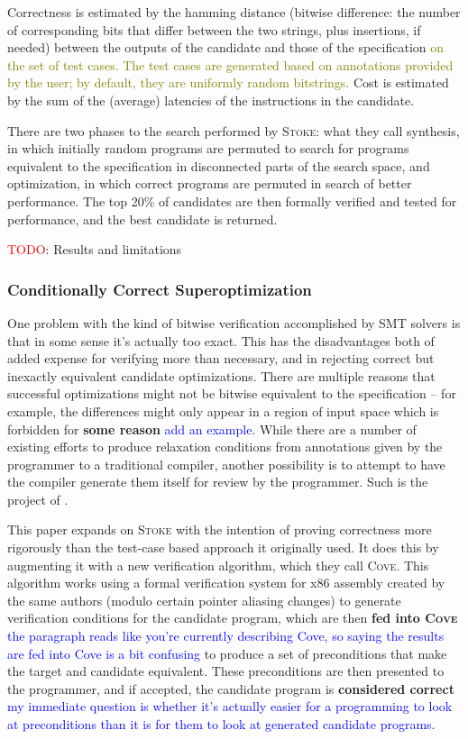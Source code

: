 \documentclass[12pt,twoside]{reedthesis}
\newcommand{\red}[1]{\textcolor{red}{#1}}
\newcommand{\green}[1]{\textcolor{olive}{#1}}
\newcommand{\comment}[2]{\textbf{#1} \textcolor{blue}{#2}}
\newcommand{\addressed}[2]{{#1}}
\begin{document}
Correctness is estimated by the hamming distance (bitwise difference: the number of corresponding bits that differ between the two strings, plus insertions, if needed) between the outputs of the candidate and those of the specification 
\green{on the set of test cases.
The test cases are generated based on annotations provided by the user; by default, they are uniformly random bitstrings.
} %
Cost is estimated by the sum of the (average) latencies of the instructions in the candidate.
    
There are two phases to the search performed by \textsc{Stoke}:
    what they call synthesis, in which initially random programs are permuted to search for programs equivalent to the specification in disconnected parts of the search space,
    and optimization, in which correct programs are permuted in search of better performance.
The top 20\% of candidates are then formally verified and tested for performance, and the best candidate is returned.
    
\red{TODO}: Results and limitations

\subsubsection{Conditionally Correct Superoptimization}
One problem with the kind of bitwise verification accomplished by SMT solvers is that in some sense it's actually too exact.
This has the disadvantages both of added expense for verifying more than necessary, and in rejecting correct but inexactly equivalent candidate optimizations.
There are multiple reasons that successful optimizations might not be bitwise equivalent to the specification
    -- for example, the differences might only appear in a region of input space which is forbidden for \comment{some reason}{add an example}.
While there are a number of existing efforts to produce relaxation conditions from annotations given by the programmer to a traditional compiler, another possibility is to attempt to have the compiler generate them itself for review by the programmer.
Such is the project of \cite{sharma2015conditionally}.
    
This paper expands on \textsc{Stoke} with the intention of proving correctness more rigorously than the test-case based approach it originally used.
It does this by augmenting it with a new verification algorithm, which they call \textsc{Cove}.
This algorithm works using a formal verification system for x86 assembly created by the same authors \cite{sharma2013ddec} (modulo certain pointer aliasing changes) to generate verification conditions for the candidate program, which are then
    \comment{fed into \textsc{Cove}}{the paragraph reads like you're currently describing Cove, so saying the results are fed into Cove is a bit confusing}
    to produce a set of preconditions that make the target and candidate equivalent.
These preconditions are then presented to the programmer, and if accepted, the candidate program is
    \comment{considered correct}{my immediate question is whether it's actually easier for a programming to look at preconditions than it is for them to look at generated candidate programs}.
    
\end{document}
